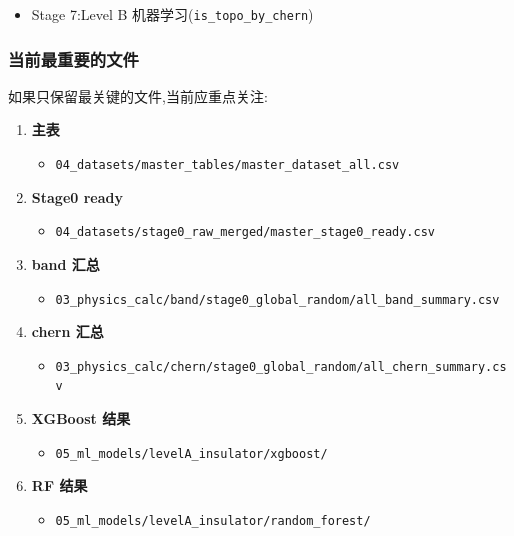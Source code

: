 \documentclass[lang=cn,scheme=chinese,color=blue,device=normal,toc=onecol,math=cm]{elegantbook}
\begin{document}
\begin{itemize}
\item Stage 7:Level B 机器学习(\texttt{is\_\allowbreak{}topo\_\allowbreak{}by\_\allowbreak{}chern})
\end{itemize}


\subsubsection{当前最重要的文件}


如果只保留最关键的文件,当前应重点关注:\par


\begin{enumerate}
\item \textbf{主表} 
\begin{itemize}
\item \texttt{04\_\allowbreak{}datasets/\allowbreak{}master\_\allowbreak{}tables/\allowbreak{}master\_\allowbreak{}dataset\_\allowbreak{}all.csv}
\end{itemize}
\item \textbf{Stage0 ready} 
\begin{itemize}
\item \texttt{04\_\allowbreak{}datasets/\allowbreak{}stage0\_\allowbreak{}raw\_\allowbreak{}merged/\allowbreak{}master\_\allowbreak{}stage0\_\allowbreak{}ready.csv}
\end{itemize}
\item \textbf{band 汇总} 
\begin{itemize}
\item \texttt{03\_\allowbreak{}physics\_\allowbreak{}calc/\allowbreak{}band/\allowbreak{}stage0\_\allowbreak{}global\_\allowbreak{}random/\allowbreak{}all\_\allowbreak{}band\_\allowbreak{}summary.csv}
\end{itemize}
\item \textbf{chern 汇总} 
\begin{itemize}
\item \texttt{03\_\allowbreak{}physics\_\allowbreak{}calc/\allowbreak{}chern/\allowbreak{}stage0\_\allowbreak{}global\_\allowbreak{}random/\allowbreak{}all\_\allowbreak{}chern\_\allowbreak{}summary.csv}
\end{itemize}
\item \textbf{XGBoost 结果} 
\begin{itemize}
\item \texttt{05\_\allowbreak{}ml\_\allowbreak{}models/\allowbreak{}levelA\_\allowbreak{}insulator/\allowbreak{}xgboost/\allowbreak{}}
\end{itemize}
\item \textbf{RF 结果} 
\begin{itemize}
\item \texttt{05\_\allowbreak{}ml\_\allowbreak{}models/\allowbreak{}levelA\_\allowbreak{}insulator/\allowbreak{}random\_\allowbreak{}forest/\allowbreak{}}
\end{itemize}
\end{enumerate}
\end{document}
